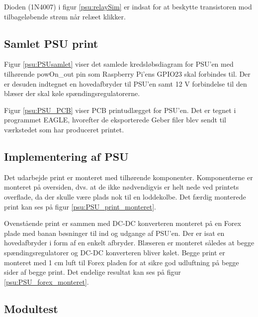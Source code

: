 Dioden (1N4007) i figur \ref{psu:relaySim} er indsat for at beskytte transistoren mod tilbageløbende strøm når relæet klikker. 


\subsection{Samlet PSU print}


Figur \ref{psu:PSUsamlet} viser det samlede kredsløbsdiagram for PSU'en med tilhørende powOn\_out pin som Raspberry Pi'ens GPIO23 skal forbindes til. Der er desuden indtegnet en hovedafbryder til PSU'en samt 12 V forbindelse til den blæser der skal køle spændingsregulatorerne.

Figur \ref{psu:PSU_PCB} viser PCB printudlægget for PSU'en. Det er tegnet i programmet EAGLE, hvorefter de eksporterede Geber filer blev sendt til værkstedet som har produceret printet. 


\subsection{Implementering af PSU}

Det udarbejde print er monteret med tilhørende komponenter. Komponenterne er monteret på oversiden, dvs. at de  ikke nødvendigvis er helt nede ved printets overflade, da der skulle være plads nok til en loddekolbe. Det færdig monterede print kan ses på figur \ref{psu:PSU_print_monteret}.


Ovenstående print er sammen med DC-DC konverteren monteret på en Forex plade med banan bøsninger til ind og udgange af PSU'en. Der er isat en hovedafbryder i form af en enkelt afbryder. Blæseren er monteret således at begge spændingsregulatorer og DC-DC konverteren bliver kølet. Begge print er monteret med 1 cm luft til Forex pladen for at sikre god udluftning på begge sider af begge print. Det endelige resultat kan ses på figur  \ref{psu:PSU_forex_monteret}.


\subsection{Modultest}